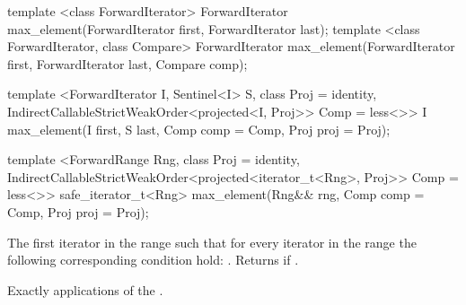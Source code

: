 %
\begin{removedblock}
\begin{itemdecl}
template <class ForwardIterator>
  ForwardIterator max_element(ForwardIterator first, ForwardIterator last);
template <class ForwardIterator, class Compare>
  ForwardIterator max_element(ForwardIterator first, ForwardIterator last,
                            Compare comp);
\end{itemdecl}
\end{removedblock}
\begin{addedblock}
\begin{itemdecl}
template <ForwardIterator I, Sentinel<I> S, class Proj = identity,
    IndirectCallableStrictWeakOrder<projected<I, Proj>> Comp = less<>>
  I max_element(I first, S last, Comp comp = Comp{}, Proj proj = Proj{});

template <ForwardRange Rng, class Proj = identity,
    IndirectCallableStrictWeakOrder<projected<iterator_t<Rng>, Proj>> Comp = less<>>
  safe_iterator_t<Rng>
    max_element(Rng&& rng, Comp comp = Comp{}, Proj proj = Proj{});
\end{itemdecl}
\end{addedblock}

\begin{itemdescr}
\pnum
\returns
The first iterator
in the range
such that for every iterator
in the range
the following corresponding condition hold:
.
Returns
if
.

\pnum
\complexity
Exactly
applications of the .
\end{itemdescr}


